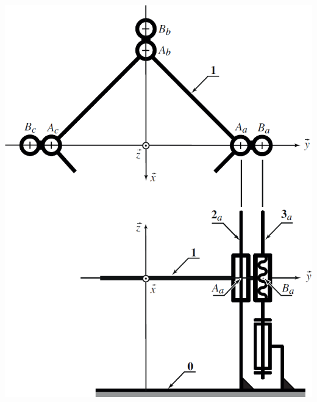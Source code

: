\documentclass[10pt,fleqn]{article} %
\begin{document}
\begin{multicols}{2}
\begin{multicols}{2}
\begin{center}
\includegraphics[width=.8\linewidth]{images/fig_04}
\end{center}

%
%


\end{multicols}
\end{multicols}
\end{document}
